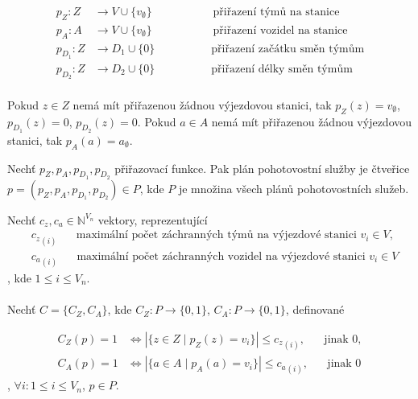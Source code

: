 \begin{definice}
  \begin{align*}
    p_Z \colon Z &\rightarrow V \cup \{ v_{\emptyset} \}                   \hspace{65pt} \text{přiřazení týmů na stanice} \\
    p_A \colon A &\rightarrow V \cup \{ v_{\emptyset} \}                   \hspace{65pt} \text{přiřazení vozidel na stanice} \\ 
    p_{D_{1}} \colon Z &\rightarrow D_{1} \cup \{ 0 \}         \hspace{60pt} \text{přiřazení začátku směn týmům} \\
    p_{D_{2}} \colon Z &\rightarrow D_{2} \cup \{ 0 \}         \hspace{60pt} \text{přiřazení délky směn týmům}
  \end{align*}
  \\
  Pokud $z \in Z$ nemá mít přiřazenou žádnou výjezdovou stanici,
  tak $p_{Z}(z) = v_{\emptyset}$, $p_{D_{1}}(z) = 0$, $p_{D_{2}}(z) = 0$.
  Pokud $a \in A$ nemá mít přiřazenou žádnou výjezdovou stanici, tak $p_{A}(a) = a_{\emptyset}$.
\end{definice}

\begin{definice}
  Nechť $p_Z, p_A, p_{D_{1}}, p_{D_{2}}$ přiřazovací funkce.
  Pak plán pohotovostní služby je čtveřice $p = (p_Z, p_A, p_{D_{1}}, p_{D_{2}}) \in P$, kde $P$ je množina všech plánů pohotovostních služeb.
\end{definice}

\clearpage

\begin{definice}
  Nechť $c_z, c_a \in \mathbb{N}^{V_n}$ vektory, reprezentující
  \begin{align*}
    &{c_z}_{(i)} \hspace{20pt} \text{maximální počet záchranných týmů na výjezdové stanici $v_i \in V$}, \\ 
    &{c_a}_{(i)} \hspace{20pt} \text{maximální počet záchranných vozidel na výjezdové stanici $v_i \in V$}
  \end{align*}
  , kde $1 \leq i \leq V_n$.
  \\
  \\
  Nechť $C = \{ C_Z, C_A \}$, kde $C_Z \colon P \rightarrow \{ 0, 1 \}$, $C_A \colon P \rightarrow \{ 0, 1 \}$, definované

  \begin{align*}
    C_Z(p) = 1 &\iff |\{ z \in Z \mid p_Z(z) = v_i \}| \leq {c_z}_{(i)}, \hspace{20pt} \text{jinak 0}, \\
    C_A(p) = 1 &\iff |\{ a \in A \mid p_A(a) = v_i \}| \leq {c_a}_{(i)}, \hspace{20pt} \text{jinak 0}
  \end{align*}
  , $\forall i \colon 1 \leq i \leq V_n$, $p \in P$.
  \\
\end{definice}

